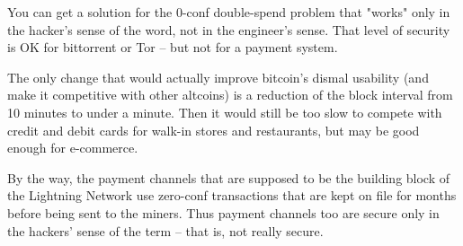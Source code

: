You can get a solution for the 0-conf double-spend problem that "works" only in the hacker's sense of the word, not in the engineer's sense. That level of security is OK for bittorrent or Tor -- but not for a payment system.

The only change that would actually improve bitcoin's dismal usability (and make it competitive with other altcoins) is a reduction of the block interval from 10 minutes to under a minute. Then it would still be too slow to compete with credit and debit cards for walk-in stores and restaurants, but may be good enough for e-commerce.

By the way, the payment channels that are supposed to be the building block of the Lightning Network use zero-conf transactions that are kept on file for months before being sent to the miners. Thus payment channels too are secure only in the hackers' sense of the term -- that is, not really secure.

